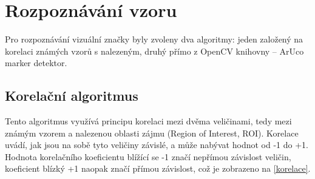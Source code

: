 \documentclass[twoside]{ctuthesis}
\theoremstyle{plain}
\theoremstyle{definition}
\theoremstyle{note}
\begin{document}
\section{Rozpoznávání vzoru}

Pro rozpoznávání vizuální značky byly zvoleny dva algoritmy: jeden založený na korelaci známých vzorů s nalezeným, druhý přímo z OpenCV knihovny -- ArUco marker detektor.

\subsection{Korelační algoritmus}

Tento algoritmus využívá principu korelaci mezi dvěma veličinami, tedy mezi známým vzorem a nalezenou oblasti zájmu (Region of Interest, ROI). Korelace uvádí, jak jsou na sobě tyto veličiny závislé, a může nabývat hodnot od -1 do +1. Hodnota korelačního koeficientu blížící se -1 značí nepřímou závislost veličin, koeficient blízký +1 naopak značí přímou závislost, což je zobrazeno na \ref{korelace}.
\end{document}
